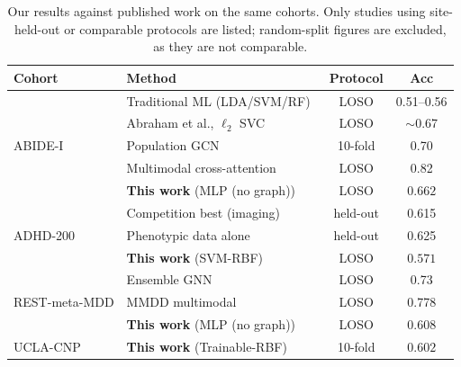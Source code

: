 \begin{table}[t]
\caption{Our results against published work on the same cohorts. Only studies using site-held-out or comparable protocols are listed; random-split figures are excluded, as they are not comparable.}
\label{tab:published-comparison}
\centering
\small
\renewcommand{\arraystretch}{1.15}
\begin{tabular}{|l|l|c|c|}
\hline
\textbf{Cohort} & \textbf{Method} & \textbf{Protocol} & \textbf{Acc} \\
\hline
 \multirow{5}{*}{ABIDE-I} & Traditional ML (LDA/SVM/RF)~\cite{eslami2019} & LOSO & 0.51--0.56 \\
  & Abraham et al., $\ell_2$ SVC~\cite{abraham2017} & LOSO & $\sim$0.67 \\
  & Population GCN~\cite{parisot2018} & 10-fold & 0.70 \\
  & Multimodal cross-attention~\cite{fusion2026} & LOSO & 0.82 \\
  & \textbf{This work} (MLP (no graph)) & LOSO & $\mathbf{0.662}$ \\
\hline
 \multirow{3}{*}{ADHD-200} & Competition best (imaging)~\cite{adhd200comp} & held-out & 0.615 \\
  & Phenotypic data alone~\cite{brown2012} & held-out & 0.625 \\
  & \textbf{This work} (SVM-RBF) & LOSO & $\mathbf{0.571}$ \\
\hline
 \multirow{3}{*}{REST-meta-MDD} & Ensemble GNN~\cite{mddgnn} & LOSO & 0.73 \\
  & MMDD multimodal~\cite{mmdd} & LOSO & 0.778 \\
  & \textbf{This work} (MLP (no graph)) & LOSO & $\mathbf{0.608}$ \\
\hline
 \multirow{1}{*}{UCLA-CNP} & \textbf{This work} (Trainable-RBF) & 10-fold & $\mathbf{0.602}$ \\
\hline
\end{tabular}
\end{table}
